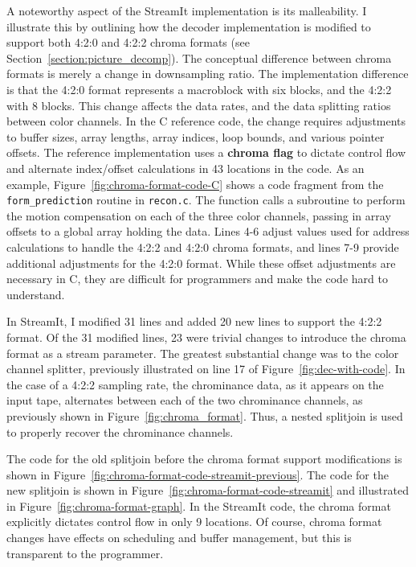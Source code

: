 A noteworthy aspect of the StreamIt implementation is its
malleability. I illustrate this by outlining how the decoder
implementation is modified to support both 4:2:0 and 4:2:2 chroma
formats (see Section~\ref{section:picture_decomp}). 
The conceptual difference between chroma formats is merely a change in
downsampling ratio. The implementation difference is that the 4:2:0 format
represents a macroblock with six blocks, and the 4:2:2 with 8 blocks. This
change affects the data rates, and the data splitting ratios between color channels. 
In the C reference code, the change requires adjustments to buffer sizes, array lengths, array
indices, loop bounds, and various pointer offsets. The reference implementation
uses a \textbf{chroma flag} to dictate control flow and alternate
index/offset calculations in 43 locations in the code. As an example,
Figure~\ref{fig:chroma-format-code-C} shows a code fragment from the
\texttt{form\_prediction} routine in
\texttt{recon.c}. The function calls a
subroutine to perform the motion compensation on each of the three
color channels, passing in array offsets to a global array holding the
data. Lines 4-6 adjust values used for address calculations to handle
the 4:2:2 and 4:2:0 chroma formats, and lines 7-9 provide additional
adjustments for the 4:2:0 format. While these offset adjustments are
necessary in C, they are difficult for programmers and make the code
hard to understand.

In StreamIt, I modified 31 lines and added 20 new lines to support
the 4:2:2 format. Of the 31 modified lines, 23 were trivial changes to
introduce the chroma format as a stream parameter. The greatest
substantial change was to the color channel splitter, previously
illustrated on line 17 of Figure~\ref{fig:dec-with-code}. In the case
of a 4:2:2 sampling rate, the chrominance data, as it appears on the
input tape, alternates between each of the two chrominance
channels, as previously shown in Figure~\ref{fig:chroma_format}.
Thus, a nested splitjoin is used to properly recover the
chrominance channels. 

The code for the old splitjoin before the chroma format
support modifications is shown in 
Figure~\ref{fig:chroma-format-code-streamit-previous}.
The code for the new splitjoin is shown in 
Figure~\ref{fig:chroma-format-code-streamit} and
illustrated in Figure~\ref{fig:chroma-format-graph}.  
In the StreamIt code, the chroma
format explicitly dictates control flow in only 9 locations. Of
course, chroma format changes have effects on scheduling 
and buffer management, but this is transparent to the programmer.

